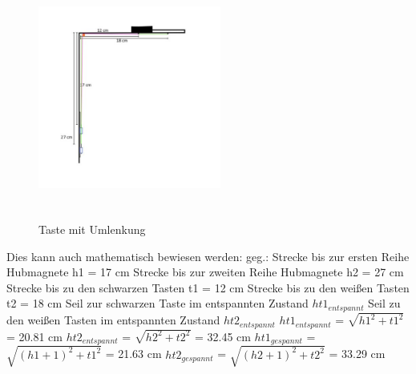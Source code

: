 \begin{figure}[htbp]
	\centering
	\includegraphics[width=6cm, height=8cm]{img/mitUmlenkung_locker}
	\caption{Taste mit Umlenkung}
\end{figure}


Dies kann auch mathematisch bewiesen werden:
\newline geg.: %
\newline Strecke bis zur ersten Reihe Hubmagnete h1 = 17 cm %
\newline Strecke bis zur zweiten Reihe Hubmagnete h2 = 27 cm
\newline Strecke bis zu den schwarzen Tasten t1 = 12 cm
\newline Strecke bis zu den weißen Tasten t2 = 18 cm
\newline Seil zur schwarzen Taste im entspannten Zustand $ht1_{entspannt}$ %
\newline Seil zu den weißen Tasten im entspannten Zustand $ht2_{entspannt}$
\newline $ht1_{entspannt}$ = $\sqrt {h1^{2} + t1^{2}}$ = 20.81 cm
\newline $ht2_{entspannt}$ = $\sqrt {h2^{2} + t2^{2}}$ = 32.45 cm
\newline $ht1_{gespannt}$ = $\sqrt {(h1 + 1) ^{2} + t1^{2}}$ = 21.63 cm
\newline $ht2_{gespannt}$ = $\sqrt {(h2 + 1)^{2} + t2^{2}}$ = 33.29 cm

